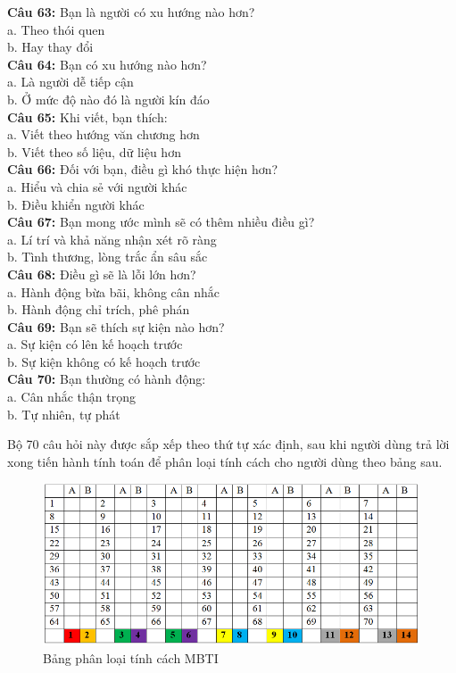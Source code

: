 \begin{multicols}{2}
\textbf{Câu 63:} Bạn là người có xu hướng nào hơn? \\
a. Theo thói quen \\
b. Hay thay đổi \\
\textbf{Câu 64:} Bạn có xu hướng nào hơn? \\
a. Là người dễ tiếp cận \\
b. Ở mức độ nào đó là người kín đáo \\
\textbf{Câu 65:} Khi viết, bạn thích: \\
a. Viết theo hướng văn chương hơn \\
b. Viết theo số liệu, dữ liệu hơn \\
\textbf{Câu 66:} Đối với bạn, điều gì khó thực hiện hơn? \\
a. Hiểu và chia sẻ với người khác \\
b. Điều khiển người khác \\
\textbf{Câu 67:} Bạn mong ước mình sẽ có thêm nhiều điều gì? \\
a. Lí trí và khả năng nhận xét rõ ràng \\
b. Tình thương, lòng trắc ẩn sâu sắc \\
\textbf{Câu 68:} Điều gì sẽ là lỗi lớn hơn? \\
a. Hành động bừa bãi, không cân nhắc \\
b. Hành động chỉ trích, phê phán \\
\textbf{Câu 69:} Bạn sẽ thích sự kiện nào hơn? \\
a. Sự kiện có lên kế hoạch trước \\
b. Sự kiện không có kế hoạch trước \\
\textbf{Câu 70:} Bạn thường có hành động: \\
a. Cân nhắc thận trọng \\
b. Tự nhiên, tự phát \\
\end{multicols}

Bộ 70 câu hỏi này được sắp xếp theo thứ tự xác định, sau khi người dùng trả lời xong tiến hành tính toán để phân loại tính cách cho người dùng theo bảng sau.
\begin{figure}[H]
    \centering
    \includegraphics[width=0.6\linewidth]{images/MBTItable.png}
    \vspace{0.5cm}
    \caption{Bảng phân loại tính cách MBTI}
\end{figure}

